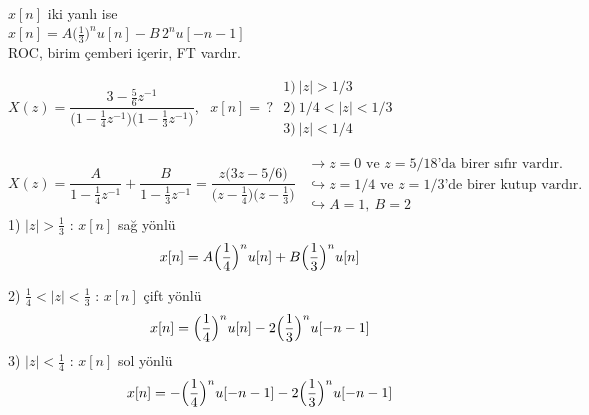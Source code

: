 \documentclass[11pt,a4paper]{article}
\begin{document}
\begin{minipage}[t]{0.32\linewidth}
  \centering
  \\
  \raggedright\small
  $x[n]$ iki yanlı ise\\[1mm]
  $x[n]=A\bigl(\frac13\bigr)^nu[n]-B\,2^nu[-n-1]$\\[1mm]
  ROC, birim çemberi içerir, FT vardır.
\end{minipage}

\begin{ornek}[]
  $X(z)=\dfrac{3-\frac56z^{-1}}{\bigl(1-\frac14z^{-1}\bigr)\bigl(1-\frac13z^{-1}\bigr)}$, \ $x[n]=\,?$
  \qquad
  $\begin{array}{l}
    1)\ |z|>1/3\\
    2)\ 1/4<|z|<1/3\\
    3)\ |z|<1/4
  \end{array}$
\end{ornek}
\[
  X(z)=\frac{A}{1-\frac14z^{-1}}+\frac{B}{1-\frac13z^{-1}}=\frac{z\bigl(3z-5/6\bigr)}{\bigl(z-\frac14\bigr)\bigl(z-\frac13\bigr)}\ \
  \begin{array}{l}
    \longrightarrow z=0 \text{ ve } z=5/18\text{'da birer sıfır vardır.}\\
    \hookrightarrow z=1/4 \text{ ve } z=1/3\text{'de birer kutup vardır.}\\
    \hookrightarrow A=1,\ B=2
  \end{array}
\]
1) $|z|>\frac13$ : $x[n]$ sağ yönlü
\[ x[n]=A\Bigl(\frac14\Bigr)^nu[n]+B\Bigl(\frac13\Bigr)^nu[n] \]

2) $\frac14<|z|<\frac13$ : $x[n]$ çift yönlü
\[ x[n]=\Bigl(\frac14\Bigr)^nu[n]-2\Bigl(\frac13\Bigr)^nu[-n-1] \]
3) $|z|<\frac14$ : $x[n]$ sol yönlü
\[ x[n]=-\Bigl(\frac14\Bigr)^nu[-n-1]-2\Bigl(\frac13\Bigr)^nu[-n-1] \]
\end{document}
